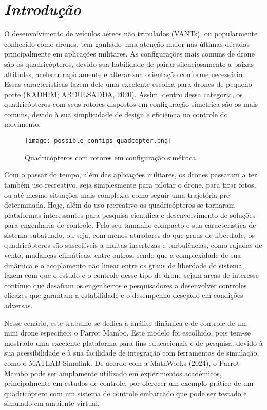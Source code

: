 \chapter{\textit{Introdução}}

O desenvolvimento de veículos aéreos não tripulados (VANTs), ou popularmente conhecido como drones, tem ganhado uma atenção maior nas últimas décadas principalmente em aplicações militares. As configurações mais comuns de drone são os quadricópteros, devido sua habilidade de pairar silenciosamente a baixas altitudes, acelerar rapidamente e alterar sua orientação conforme necessário. Essas características fazem dele uma excelente escolha para drones de pequeno porte (KADHIM; ABDULSADDA, 2020). Assim, dentro dessa categoria, os quadricópteros com seus rotores dispostos em configuração simétrica são os mais comuns, devido à sua simplicidade de design e eficiência no controle do movimento.

\begin{figure}[H]
	\centering
	\texttt{[image: possible\_configs\_quadcopter.png]}
	\caption{Quadricópteros com rotores em configuração simétrica.}
	\centering
	\label{multiple drone rotor configuration}
\end{figure}


Com o passar do tempo, além das aplicações militares, os drones passaram a ter também uso recreativo, seja simplesmente para pilotar o drone, para tirar fotos, ou até mesmo situações mais complexas como seguir uma trajetória pré-determinada. Hoje, além do uso recreativo os quadricópteros se tornaram plataformas interessantes para pesquisa científica e desenvolvimento de soluções para engenharia de controle.  Pelo seu tamanho compacto e sua característica de sistema subatuado, ou seja, com menos atuadores do que graus de liberdade, os quadricópteros são suscetíveis a muitas incertezas e turbulências, como rajadas de vento, mudanças climáticas, entre outros,
sendo que a complexidade de sua dinâmica e o acoplamento não linear entre os graus de liberdade do sistema, fazem com que o estudo e o controle desse tipo de drone sejam áreas de interesse contínuo que desafiam os engenheiros e pesquisadores a desenvolver controles eficazes que garantam a estabilidade e o desempenho desejado em condições adversas.

Nesse cenário, este trabalho se dedica à análise dinâmica e de controle de um mini drone específico: o Parrot Mambo. Este modelo foi escolhido, pois tem-se mostrado uma excelente plataforma para fins educacionais e de pesquisa, devido à sua acessibilidade e à sua facilidade de integração com ferramentas de simulação, como o MATLAB Simulink. De acordo com a MathWorks (2024), o Parrot Mambo pode ser amplamente utilizado em experimentos acadêmicos, principalmente em estudos de controle, por oferecer um exemplo prático de um quadricóptero com um sistema de controle embarcado que pode ser testado e simulado em ambiente virtual.

